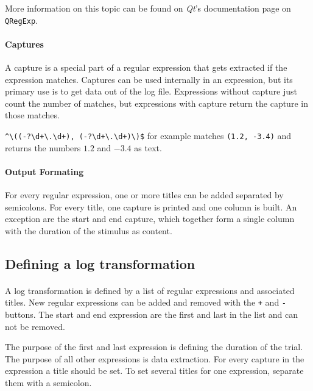 More information on this topic can be found on \textit{Qt}'s documentation page on \lstinline{QRegExp}\cite{regexp}.

\paragraph{Captures}
A capture is a special part of a regular expression that gets extracted if the expression matches.
Captures can be used internally in an expression, but its primary use is to get data out of the log file.
Expressions without capture just count the number of matches, but expressions with capture return the capture in those matches.

\verb|^\((-?\d+\.\d+), (-?\d+\.\d+)\)$| for example matches \texttt{(1.2, -3.4)} and returns the numbers $1.2$ and $-3.4$ as text.

\paragraph{Output Formating}
For every regular expression, one or more titles can be added separated by semicolons.
For every title, one capture is printed and one column is built.
An exception are the start and end capture, which together form a single column with the duration of the stimulus as content.


\subsection{Defining a log transformation}
\paragraph{}
A log transformation is defined by a list of regular expressions and associated titles.
New regular expressions can be added and removed with the \texttt{+} and \texttt{-} buttons.
The start and end expression are the first and last in the list and can not be removed.

The purpose of the first and last expression is defining the duration of the trial.
The purpose of all other expressions is data extraction.
For every capture in the expression a title should be set.
To set several titles for one expression, separate them with a semicolon.

